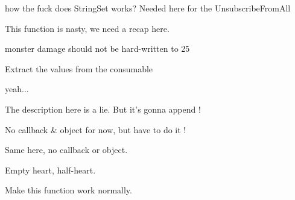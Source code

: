 \begin{DoxyRefList}
\item[\label{todo__todo000009}%
\hypertarget{todo__todo000009}{}%
Member \hyperlink{class_game_ae3c5dc329506d37d244ef3587ac813af}{Game\+:\+:add\+To\+Destroy\+List} (\hyperlink{class_elements}{Elements} $\ast$m)]how the fuck does String\+Set works? Needed here for the Unsubscribe\+From\+All  
\item[\label{todo__todo000010}%
\hypertarget{todo__todo000010}{}%
Member \hyperlink{class_game_a194dbc017575c98bda4e2317d266a67e}{Game\+:\+:display\+H\+U\+D} (void)]This function is nasty, we need a recap here.  
\item[\label{todo__todo000012}%
\hypertarget{todo__todo000012}{}%
Member \hyperlink{class_hero_a6eee44b6b391f0bff589f6869c21a090}{Hero\+:\+:\+\_\+take\+Damage} (\hyperlink{class_elements}{Elements} $\ast$m)]monster damage should not be hard-\/written to 25  
\item[\label{todo__todo000011}%
\hypertarget{todo__todo000011}{}%
Member \hyperlink{class_hero_aa41ef53abd25057ceb431811ccf80ad5}{Hero\+:\+:action\+Callback} (std\+::string name, int status)]Extract the values from the consumable  
\item[\label{todo__todo000013}%
\hypertarget{todo__todo000013}{}%
Member \hyperlink{class_hitbox_ae1b89c84071782c72ee6feb56c109c59}{Hitbox\+:\+:check\+Exists} (std\+::string)]yeah...  
\item[\label{todo__todo000015}%
\hypertarget{todo__todo000015}{}%
Member \hyperlink{class_h_u_d_window_a1c6965adb9fdd22b230d20b26fef5ac0}{H\+U\+D\+Window\+:\+:armor} (void)]The description here is a lie. But it's gonna append !  
\item[\label{todo__todo000016}%
\hypertarget{todo__todo000016}{}%
Member \hyperlink{class_h_u_d_window_acd4fdbfd1c2562384b84d3bcda80fea1}{H\+U\+D\+Window\+:\+:boots} (void)]No callback \& object for now, but have to do it !  
\item[\label{todo__todo000017}%
\hypertarget{todo__todo000017}{}%
Member \hyperlink{class_h_u_d_window_aeeafdcca95bdcdb3b31a6bc4d2e1e379}{H\+U\+D\+Window\+:\+:consumable} (std\+::map$<$ int, std\+::string $>$ m)]Same here, no callback or object.  
\item[\label{todo__todo000014}%
\hypertarget{todo__todo000014}{}%
Member \hyperlink{class_h_u_d_window_a8fc917fbfae792d046e90448c963100a}{H\+U\+D\+Window\+:\+:life} (int l)]Empty heart, half-\/heart.  
\item[\label{todo__todo000018}%
\hypertarget{todo__todo000018}{}%
Member \hyperlink{class_h_u_d_window_a8264836f3c55d8211f4e5166e9049628}{H\+U\+D\+Window\+:\+:minimap} (void)]Make this function work normally. 
\end{DoxyRefList}